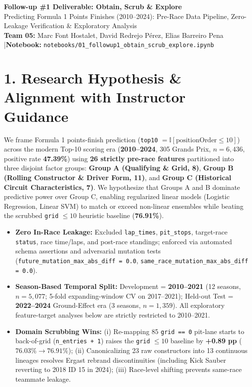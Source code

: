 \documentclass[10pt,a4paper]{article}
\begin{document}
\begin{center}
  {\LARGE\bfseries\color{navy} Follow-up \#1 Deliverable: Obtain, Scrub \& Explore}\\[4pt]
  {\large Predicting Formula 1 Points Finishes (2010--2024): Pre-Race Data Pipeline, Zero-Leakage Verification \& Exploratory Analysis}\\[5pt]
  {\small\color{slate} \textbf{Team 05:} Marc Font Hostalet, David Redrejo P\'erez, Elias Barreiro Pena \quad|\quad \textbf{Notebook:} \texttt{notebooks/01\_followup1\_obtain\_scrub\_explore.ipynb}}
\end{center}
\vspace{-4pt}

\section{1. Research Hypothesis \& Alignment with Instructor Guidance}
We frame Formula 1 points-finish prediction (\texttt{top10} $= \mathbb{I}[\text{positionOrder} \le 10]$) across the modern Top-10 scoring era (\textbf{2010--2024}, 305 Grands Prix, $n=6{,}436$, positive rate \textbf{47.39\%}) using \textbf{26 strictly pre-race features} partitioned into three disjoint factor groups: \textbf{Group A (Qualifying \& Grid, 8)}, \textbf{Group B (Rolling Constructor \& Driver Form, 11)}, and \textbf{Group C (Historical Circuit Characteristics, 7)}. We hypothesize that Groups A and B dominate predictive power over Group C, enabling regularized linear models (Logistic Regression, Linear SVM) to match or exceed non-linear ensembles while beating the scrubbed \texttt{grid} $\le 10$ heuristic baseline (\textbf{76.91\%}).

\begin{itemize}
  \item \textbf{Zero In-Race Leakage:} Excluded \texttt{lap\_times}, \texttt{pit\_stops}, target-race \texttt{status}, race time/laps, and post-race standings; enforced via automated schema assertions and adversarial mutation tests (\texttt{future\_mutation\_max\_abs\_diff = 0.0}, \texttt{same\_race\_mutation\_max\_abs\_diff = 0.0}).
  \item \textbf{Season-Based Temporal Split:} Development = \textbf{2010--2021} (12 seasons, $n=5{,}077$; 5-fold expanding-window CV on 2017--2021); Held-out Test = \textbf{2022--2024} Ground-Effect era (3 seasons, $n=1{,}359$). All exploratory feature-target analyses below are strictly restricted to 2010--2021.
  \item \textbf{Domain Scrubbing Wins:} (i) Re-mapping 85 \texttt{grid == 0} pit-lane starts to back-of-grid (\texttt{n\_entries + 1}) raises the \texttt{grid} $\le 10$ baseline by \textbf{+0.89 pp} ($76.03\% \rightarrow 76.91\%$); (ii) Canonicalizing 23 raw constructors into 13 continuous lineages resolves Ergast rebrand discontinuities (including Kick Sauber reverting to 2018 ID 15 in 2024); (iii) Race-level shifting prevents same-race teammate leakage.
\end{itemize}
\end{document}
